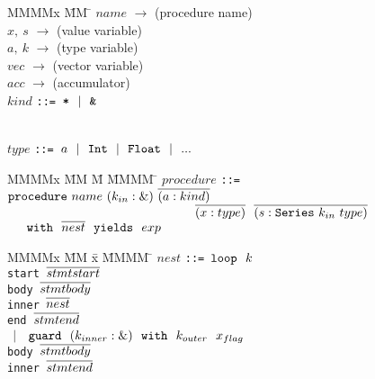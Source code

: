 
\begin{figure}
\begin{tabbing}
MMMMx           \= MM \= \kill
$name$  \> $\to$ \> (procedure name)            \\
$x,~ s$ \> $\to$ \> (value variable)            \\
$a,~ k$ \> $\to$ \> (type variable)             
\\[1ex]

$vec$   \> $\to$ \> (vector variable)           \\
$acc$   \> $\to$ \> (accumulator)
\\[2ex]

$kind$          \> \tt{::=}
                \>      $\tt{*} ~~|~~ \tt{\&}$

\\[1ex]
$type$          \> \tt{::=}
                \>      $a ~~|~~ \tt{Int} ~~|~~ \tt{Float} ~~|~~ ...$ 
\end{tabbing}

\begin{tabbing}
MMMMx           \= MM \= M \= MMMM \= \kill
$procedure$ 
 \> \tt{::=}    
        \> $\tt{procedure}~ name~ (k_{in} : \&)~ \ov{(a : kind)}$ \\
 \>     \> ~~~~~~~~~~~~~~~~~~~~~~~~~~~~ $\ov{(x : type)} 
                ~~ \ov{(s : \tt{Series}~ k_{in}~ type)}$     \\
 \>     \> ~~~$\tt{with}~~ \ov{nest}
                ~~ \tt{yields}~~ exp$
\end{tabbing}

\begin{tabbing}
MMMMx            \= MM \= x \= MMMM \= \kill
$nest$ 
 \> \tt{::=}       \> $\tt{loop}~~ k$            \\
 \>             \> \> \tt{start}  \> $\ov{stmtstart}$   \\
 \>             \> \> \tt{body}   \> $\ov{stmtbody}$    \\
 \>             \> \> \tt{inner}  \> $\ov{nest}$        \\
 \>             \> \> \tt{end}    \> $\ov{stmtend}$     
 \\[1ex]

 \> $~~|~~$     \> $\tt{guard}~~ (k_{inner} : \&)~~   
                        \tt{with}~~ k_{outer}~~ x_{flag}$ \\
 \>             \> \> \tt{body}   \> $\ov{stmtbody}$      \\
 \>             \> \> \tt{inner}  \> $\ov{stmtend}$
\end{tabbing}


\end{figure}
